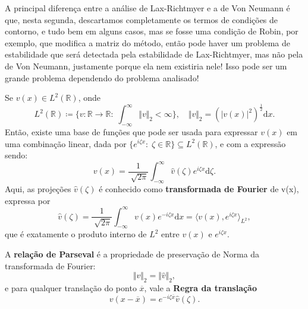 \documentclass[../differential_methods.tex]{subfiles}
\begin{document}
A principal diferença entre a análise de Lax-Richtmyer e a de Von Neumann é que, nesta segunda, descartamos completamente os termos de condições de contorno, e tudo bem em alguns casos, mas se fosse uma condição de Robin, por exemplo, que modifica a matriz do método, então pode haver um problema de estabilidade que será detectada pela estabilidade de Lax-Richtmyer, mas não pela de Von Neumann, justamente porque ela nem existiria nele! Isso pode ser um grande problema dependendo do problema analisado!

\begin{tcolorbox}[
		skin=enhanced,
		title=Lembrete!,
		after title={\hfill Produto interno \(L^{2}\) e Transformada de Fourier},
		fonttitle=\bfseries,
		sharp corners=downhill,
		colframe=black,
		colbacktitle=yellow!75!white,
		colback=yellow!30,
		colbacklower=black,
		coltitle=black,
		drop large lifted shadow
	]
	Se \(v(x)\in L^{2}(\mathbb{R})\), onde
	\[
		L^{2}(\mathbb{R})\coloneqq \biggl\{v:\mathbb{R}\rightarrow \mathbb{R}:\; \int_{-\infty}^{\infty}\Vert v \Vert_{2} < \infty\biggr\}, \quad \Vert v \Vert_{2} = (| v(x) |^{2})^{\frac{1}{2}}\mathrm{d}x.
	\]
	Então, existe uma base de funções que pode ser usada para expressar \(v(x)\) em uma combinação linear, dada por \(\{e^{i\zeta x}:\; \zeta \in \mathbb{R}\} \subseteq L^{2}(\mathbb{R})\), e com a expressão sendo:
	\[
		v(x) = \frac{1}{\sqrt[]{2\pi }}\int_{-\infty}^{\infty}\hat{v}(\zeta )e^{i\zeta x} \mathrm{d}\zeta.
	\]
	Aqui, as projeções \(\hat{v}(\zeta )\) é conhecido como \textbf{\hypertarget{fourier_transform}{transformada de Fourier}} de v(x), expressa por
	\[
		\hat{v}(\zeta ) = \frac{1}{\sqrt[]{2\pi }} \int_{-\infty}^{\infty} v(x)e^{-i\zeta x} \mathrm{d}x = \langle v(x), e^{i\zeta x} \rangle_{L^{2}},
	\]
	que é exatamente o produto interno de \(L^{2}\) entre \(v(x)\) e \(e^{i\zeta x}\).
\end{tcolorbox}
\begin{tcolorbox}[
		skin=enhanced,
		title=Lembrete!,
		after title={\hfill Propriedades da Transformada de Fourier},
		fonttitle=\bfseries,
		sharp corners=downhill,
		colframe=black,
		colbacktitle=yellow!75!white,
		colback=yellow!30,
		colbacklower=black,
		coltitle=black,
		drop large lifted shadow
	]
	A \hypertarget{parseval_relation}{\textbf{relação de Parseval}} é a propriedade de preservação de Norma da transformada de Fourier:
	\[
		\Vert v \Vert_{2} = \Vert \hat{v} \Vert_{2},
	\]
	e para qualquer translação do ponto \(\overline{x}\), vale a \hypertarget{translation_rule}{\textbf{Regra da translação}}
	\[
		v(x-\overline{x}) = e^{-i\zeta \overline{x}}\hat{v}(\zeta ).
	\]

\end{tcolorbox}
\end{document}
